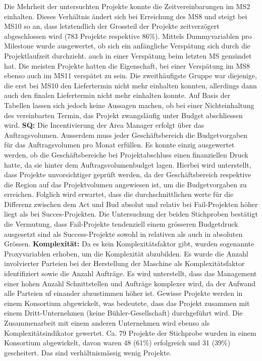 Die Mehrheit der untersuchten Projekte konnte die Zeitvereinbarungen im MS2 einhalten. Dieses Verhältnis ändert sich bei Erreichung des MS8 und steigt bei MS10 so an, dass letztendlich der Grossteil der Projekte zeitverzögert abgeschlossen wird (783 Projekte respektive 86\%). Mittels Dummyvariablen pro Milestone wurde ausgewertet, ob sich ein anfängliche Verspätung sich durch die Projektlaufzeit durchzieht. auch in einer Verspätung beim letzten MS gemündet hat. Die meisten Projekte hatten die Eigenschaft, bei einer Verspätung im MS8 ebenso auch im MS11 verspätet zu sein. Die zweithäufigste Gruppe war diejenige, die erst bei MS10 den Liefertermin nicht mehr einhalten konnten, allerdings dann auch den finalen Liefertermin nicht mehr einhalten konnte. Auf Basis der Tabellen lassen sich jedoch keine Aussagen machen, ob bei einer Nichteinhaltung des vereinbarten Termin, das Projekt zwangsläufig unter Budget abschliessen wird. 
\newline\newline\textbf{SQ:} Die Incentivierung der Area Manager erfolgt über das Auftragsvolumen. Ausserdem muss jeder Geschäftsbereich die Budgetvorgaben für das Auftragsvolumen pro Monat erfüllen.  Es konnte einzig ausgewertet werden, ob die Geschäftsbereiche bei Projektabschluss einen finanziellen Druck hatte, da sie hinter dem Auftragsvolumenbudget lagen. Hierbei wird unterstellt, dass Projekte unvorsichtiger geprüft werden, da der Geschäftsbereich respektive die Region auf das Projektvolumen angewiesen ist, um die Budgetvorgaben zu erreichen. Folglich wird erwartet, dass die durchschnittlichen werte für die Differenz zwischen dem Act und Bud absolut und relativ bei Fail-Projekten höher liegt als bei Succes-Projekten. Die Untersuchung der beiden Stichproben bestätigt die Vermutung, dass Fail-Projekte tendenziell einem grösseren Budgetdruck ausgesetzt sind als Success-Projekte sowohl in relativen als auch in absoluten Grössen.
\newline\newline\textbf{Komplexität:} Da es kein Komplexitätsfaktor gibt, wurden sogenannte Proxyvariablen erhoben, um die Komplexität abzubilden. Es wurde die Anzahl involvierter Parteien bei der Herstellung der Maschine als Komplexitätsfaktor identifiziert sowie die Anzahl Aufträge. Es wird unterstellt, dass das Management einer hohen Anzahl Schnittstellen und Aufträge komplexer wird, da der Aufwand alle Parteien uf einander abzustimmen höher ist. Gewisse Projekte werden in einem Konsortium abgewickelt, was bedeutete, dass das Projekt zusammen mit einem Dritt-Unternehmen (keine Bühler-Gesellschaft) durchgeführt wird. Die Zusammenarbeit mit einem anderen Unternehmen wird ebenso als Komplexitätsindikator gewertet. Ca. 79 Projekte der Stichprobe wurden in einem Konsortium abgewickelt, davon waren 48 (61\%) erfolgreich und 31 (39\%) gescheitert. Das sind verhältnismässig wenig Projekte.\newline

